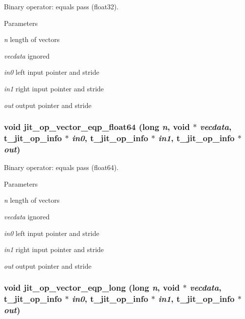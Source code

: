 Binary operator: equals pass (float32). 
\begin{DoxyParams}{Parameters}
\item[{\em n}]length of vectors \item[{\em vecdata}]ignored \item[{\em in0}]left input pointer and stride \item[{\em in1}]right input pointer and stride \item[{\em out}]output pointer and stride \end{DoxyParams}
\hypertarget{group__opvecmod_ga8a042249e30eef59453dab03202874b8}{
\subsubsection[{jit\_\-op\_\-vector\_\-eqp\_\-float64}]{\setlength{\rightskip}{0pt plus 5cm}void jit\_\-op\_\-vector\_\-eqp\_\-float64 (long {\em n}, \/  void $\ast$ {\em vecdata}, \/  {\bf t\_\-jit\_\-op\_\-info} $\ast$ {\em in0}, \/  {\bf t\_\-jit\_\-op\_\-info} $\ast$ {\em in1}, \/  {\bf t\_\-jit\_\-op\_\-info} $\ast$ {\em out})}}
\label{group__opvecmod_ga8a042249e30eef59453dab03202874b8}


Binary operator: equals pass (float64). 
\begin{DoxyParams}{Parameters}
\item[{\em n}]length of vectors \item[{\em vecdata}]ignored \item[{\em in0}]left input pointer and stride \item[{\em in1}]right input pointer and stride \item[{\em out}]output pointer and stride \end{DoxyParams}
\hypertarget{group__opvecmod_gadb2504aa1c93b137d342d2f01df8d6c4}{
\subsubsection[{jit\_\-op\_\-vector\_\-eqp\_\-long}]{\setlength{\rightskip}{0pt plus 5cm}void jit\_\-op\_\-vector\_\-eqp\_\-long (long {\em n}, \/  void $\ast$ {\em vecdata}, \/  {\bf t\_\-jit\_\-op\_\-info} $\ast$ {\em in0}, \/  {\bf t\_\-jit\_\-op\_\-info} $\ast$ {\em in1}, \/  {\bf t\_\-jit\_\-op\_\-info} $\ast$ {\em out})}}
\label{group__opvecmod_gadb2504aa1c93b137d342d2f01df8d6c4}


